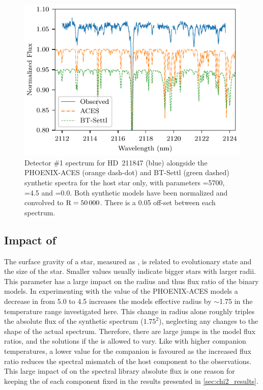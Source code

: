 \begin{figure}
    \centering
    \includegraphics[width=0.8\hsize]{figures/companion_recovery/HD211847_ACES_BTSettl.pdf}
    \caption{Detector \#1 spectrum for {HD~211847} (blue) alongside the {PHOENIX-ACES} (orange dash-dot) and {BT-Settl} (green dashed) synthetic spectra for the host star only, with parameters \Teff{}=5700\K{}, \Logg{}=4.5 and \feh{}=0.0.
        Both synthetic models have been normalized and convolved to \(\rm R=50\,000\).
        There is a 0.05 off-set between each spectrum.}
    \label{fig:hd211847-models}
\end{figure}

\subsection{Impact of \Logg{}}
\label{subsec:logg}
The surface gravity of a star, measured as \Logg{}, is related to evolutionary state and the size of the star.
Smaller \Logg{} values usually indicate bigger stars with larger radii.
This parameter has a large impact on the radius and thus flux ratio of the binary models.
In experimenting with the \Logg{} value of the {PHOENIX-ACES} models a decrease in \Logg{} from 5.0 to 4.5 increases the models effective radius by \(\sim\)1.75 in the temperature range investigated here.
This change in radius alone roughly triples the absolute flux of the synthetic spectrum (\(1.75^2\)), neglecting any changes to the shape of the actual spectrum.
Therefore, there are large jumps in the model flux ratios, and the \textchisquared{} solutions if the \Logg{} is allowed to vary.
Like with higher companion temperatures, a lower \Logg{} value for the companion is favoured as the increased flux ratio reduces the spectral mismatch of the host component to the observations.
This large impact of \Logg{} on the spectral library absolute flux is one reason for keeping the \Logg{} of each component fixed in the \textchisquared{} results presented in \cref{sec:chi2_results}.

